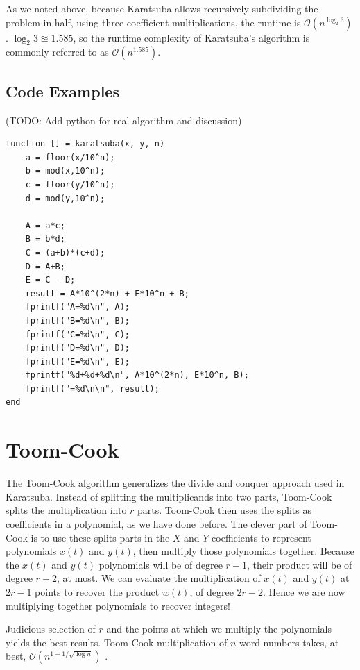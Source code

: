\documentclass[psamsfonts,reqno]{amsart}
\theoremstyle{definition}
\theoremstyle{remark}
\numberwithin{equation}{section}
\begin{document}
As we noted above, because Karatsuba allows recursively subdividing the problem in half, using three coefficient multiplications, the runtime is $\mathcal{O}(n^{\log_2{3}})$. $\log_2{3} \approxeq 1.585$, so the runtime complexity of Karatsuba's algorithm is commonly referred to as $\mathcal{O}(n^{1.585})$. 

\subsection{Code Examples \nopunct}

(TODO: Add python for real algorithm and discussion)

\begin{verbatim}
function [] = karatsuba(x, y, n)
	a = floor(x/10^n);
	b = mod(x,10^n);
	c = floor(y/10^n);
	d = mod(y,10^n);
	
	A = a*c;
	B = b*d;
	C = (a+b)*(c+d);
	D = A+B;
	E = C - D;
	result = A*10^(2*n) + E*10^n + B;
	fprintf("A=%d\n", A);
	fprintf("B=%d\n", B);
	fprintf("C=%d\n", C);
	fprintf("D=%d\n", D);
	fprintf("E=%d\n", E);
	fprintf("%d+%d+%d\n", A*10^(2*n), E*10^n, B);
	fprintf("=%d\n\n", result);
end	
\end{verbatim}

\section{Toom-Cook}

The Toom-Cook algorithm generalizes the divide and conquer approach used in Karatsuba. Instead of splitting the multiplicands into two parts, Toom-Cook splits the multiplication into $r$ parts. Toom-Cook then uses the splits as coefficients in a polynomial, as we have done before. The clever part of Toom-Cook is to use these splits parts in the $X$ and $Y$ coefficients to represent polynomials $x(t)$ and $y(t)$, then multiply those polynomials together. Because the $x(t)$ and $y(t)$ polynomials will be of degree $r-1$, their product will be of degree $r-2$, at most. We can evaluate the multiplication of $x(t)$ and $y(t)$ at $2r-1$ points to recover the product $w(t)$, of degree $2r-2$. Hence we are now multiplying together polynomials to recover integers! 

Judicious selection of $r$ and the points at which we multiply the polynomials yields the best results. Toom-Cook multiplication of $n$-word numbers takes, at best, $\mathcal{O}(n^{1+1/\sqrt{\log{n}}})$ \cite{brent2010modern}.
\end{document}

